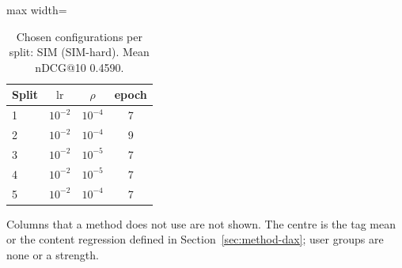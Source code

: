 \begin{table}[tbp]
\centering
\footnotesize
\caption{Chosen configurations per split: SIM (SIM-hard). Mean nDCG@10 0.4590.}
\label{tab:grid10}
\begin{adjustbox}{max width=\linewidth}
\begin{tabular}{lccc}
\toprule
Split & $\mathrm{lr}$ & $\rho$ & epoch \\
\midrule
1 & $10^{-2}$ & $10^{-4}$ & 7 \\
2 & $10^{-2}$ & $10^{-4}$ & 9 \\
3 & $10^{-2}$ & $10^{-5}$ & 7 \\
4 & $10^{-2}$ & $10^{-5}$ & 7 \\
5 & $10^{-2}$ & $10^{-4}$ & 7 \\
\bottomrule
\end{tabular}
\end{adjustbox}
\par\smallskip
\begin{minipage}{\linewidth}\raggedright\footnotesize Columns that a method does not use are not shown. The centre is the tag mean or the content regression defined in Section~\ref{sec:method-dax}; user groups are none or a strength.\end{minipage}
\end{table}
